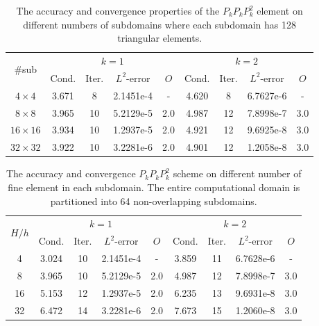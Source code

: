 				\vspace{5mm}
				\begin{table}[H]
					\vspace{-10pt}
					\setlength{\tabcolsep}{1pt} {
						\vspace{-5pt}
						\begin{center}
							\begin{tabular}{c|cccc|cccc}
								\hline
								\multirow{2}{*}{\#sub} &\multicolumn{4}{c|}{$k=1$} &\multicolumn{4}{c}{$k=2$}\\ 
								& Cond.   & Iter. &$L^2$-error & $O$  &  Cond.   & Iter. &$L^2$-error & $O$ \\
								\hline
								$4\times 4$     &3.671 & 8  &2.1451e-4 &- &4.620 &8   &6.7627e-6 &- \\
								$8\times 8$     &3.965 &10 &5.2129e-5 &2.0  &4.987 &12 &7.8998e-7 &3.0 \\
								$16\times 16$ &3.934 &10 &1.2937e-5 &2.0  &4.921 &12 &9.6925e-8 &3.0  \\
								$32\times 32$ &3.922 &10 &3.2281e-6 &2.0  &4.901 &12 &1.2058e-8 &3.0\\
								\hline	
							\end{tabular}
						\end{center} }
						\caption{The accuracy and convergence properties of the $P_{k}P_{k}P_{k}^2$ element on different numbers of subdomains where each subdomain has 128 triangular elements. }
						\label{Tab:case1_PkPkPk Row1}
					\end{table}
					\vspace{5mm}
					\begin{table}[H]
						\vspace{-10pt}
						\setlength{\tabcolsep}{1pt} {
							\vspace{-5pt}
							\begin{center}
								\begin{tabular}{c|cccc|cccc}
									\hline
									\multirow{2}{*}{$H/h$} &\multicolumn{4}{c|}{$k=1$} &\multicolumn{4}{c}{$k=2$}\\ 
									& Cond.   & Iter. &$L^2$-error & $O$  & Cond.   & Iter. &$L^2$-error & $O$ \\
									\hline
									4   &3.024 &10 &2.1451e-4 &-  &3.859 &11 &6.7628e-6 &- \\
									8   &3.965 &10 &5.2129e-5 &2.0  &4.987 &12 &7.8998e-7 &3.0 \\
									16 &5.153 &12 &1.2937e-5 &2.0 &6.235 &13 &9.6931e-8 &3.0 \\
									32 &6.472 &14 &3.2281e-6 &2.0  &7.673 &15 &1.2060e-8 &3.0 \\
									\hline	
								\end{tabular}
							\end{center} }
							\caption{The accuracy and convergence  $P_{k}P_{k}P_{k}^2$ scheme on different number of fine element in each subdomain. The entire computational domain is partitioned into 64 non-overlapping subdomains.}
							\label{Tab:case1_PkPkPk Row2}
						\end{table}
						
